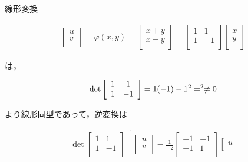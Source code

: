 \documentclass[a4paper,10pt]{jarticle}
\begin{document}
\begin{enumerate}
線形変換
\begin{fleqn}[30pt] \begin{gather*}
 	\left[ \begin{array}{r}
		u \\
		v \\
	\end{array}  \right]
	= \varphi(x,y)=
 	\left[ \begin{array}{r}
		x+y \\
		x-y \\
	\end{array}  \right]
	=
 	\left[ \begin{array}{cc}
		1 & 1 \\
		1 & -1 \\
	\end{array}  \right]
 	\left[ \begin{array}{r}
		x \\
		y \\
	\end{array}  \right]
\end{gather*} \end{fleqn}
は，
\begin{fleqn}[30pt] \begin{gather*}
	\rm{det}
 	\left[ \begin{array}{cc}
		1 & 1 \\
		1 & -1 \\
	\end{array}  \right]
	=1(-1)-1^2=^2 \ne 0
\end{gather*} \end{fleqn}
より線形同型であって，逆変換は
\begin{fleqn}[30pt] \begin{gather*}
	\det
 	\left[ \begin{array}{cc}
		1 & 1 \\
		1 & -1 \\
	\end{array}  \right]^{-1}
 	\left[ \begin{array}{r}
		u \\
		v \\
	\end{array}  \right]
	-\frac{1}{-2}
 	\left[ \begin{array}{cc}
		-1 & -1 \\
		-1 & 1 \\
	\end{array}  \right]
 	\left[ \begin{array}{r}
		u \\

\end{array}
\end{gather*}
\end{fleqn}
\end{enumerate}
\end{document}
